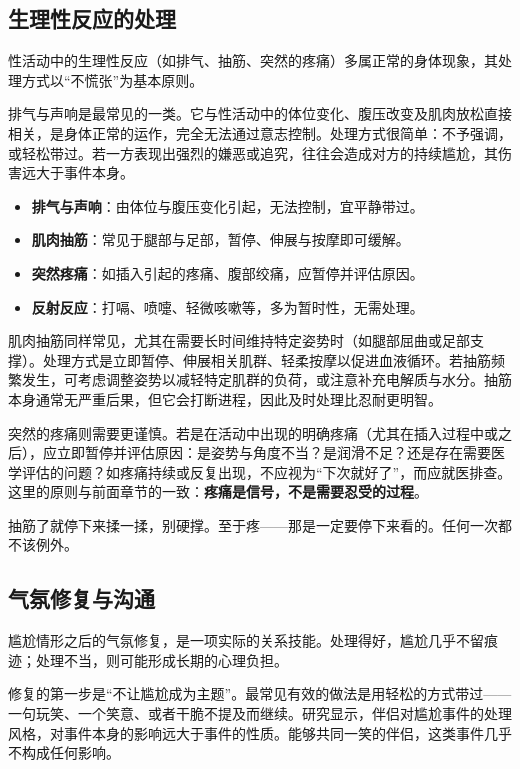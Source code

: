 \documentclass[12pt,UTF8]{ctexbook}
\newcommand{\keyword}[1]{\textbf{#1}}
\begin{document}
\subsection{生理性反应的处理}

性活动中的生理性反应（如排气、抽筋、突然的疼痛）多属正常的身体现象，其处理方式以“不慌张”为基本原则。

排气与声响是最常见的一类。它与性活动中的体位变化、腹压改变及肌肉放松直接相关，是身体正常的运作，完全无法通过意志控制。处理方式很简单：不予强调，或轻松带过。若一方表现出强烈的嫌恶或追究，往往会造成对方的持续尴尬，其伤害远大于事件本身。

\begin{itemize}
  \item \keyword{排气与声响}：由体位与腹压变化引起，无法控制，宜平静带过。
  \item \keyword{肌肉抽筋}：常见于腿部与足部，暂停、伸展与按摩即可缓解。
  \item \keyword{突然疼痛}：如插入引起的疼痛、腹部绞痛，应暂停并评估原因。
  \item \keyword{反射反应}：打嗝、喷嚏、轻微咳嗽等，多为暂时性，无需处理。
\end{itemize}

肌肉抽筋同样常见，尤其在需要长时间维持特定姿势时（如腿部屈曲或足部支撑）。处理方式是立即暂停、伸展相关肌群、轻柔按摩以促进血液循环。若抽筋频繁发生，可考虑调整姿势以减轻特定肌群的负荷，或注意补充电解质与水分。抽筋本身通常无严重后果，但它会打断进程，因此及时处理比忍耐更明智。

突然的疼痛则需要更谨慎。若是在活动中出现的明确疼痛（尤其在插入过程中或之后），应立即暂停并评估原因：是姿势与角度不当？是润滑不足？还是存在需要医学评估的问题？如疼痛持续或反复出现，不应视为“下次就好了”，而应就医排查。这里的原则与前面章节的一致：\keyword{疼痛是信号，不是需要忍受的过程}。

\begin{tcolorbox}[colback=pink!5!white,colframe=red!50!black,title=贴心小叮咛]
抽筋了就停下来揉一揉，别硬撑。至于疼——那是一定要停下来看的。任何一次都不该例外。
\end{tcolorbox}
\subsection{气氛修复与沟通}

尴尬情形之后的气氛修复，是一项实际的关系技能。处理得好，尴尬几乎不留痕迹；处理不当，则可能形成长期的心理负担。

修复的第一步是“不让尴尬成为主题”。最常见有效的做法是用轻松的方式带过——一句玩笑、一个笑意、或者干脆不提及而继续。研究显示，伴侣对尴尬事件的处理风格，对事件本身的影响远大于事件的性质。能够共同一笑的伴侣，这类事件几乎不构成任何影响。
\end{document}
